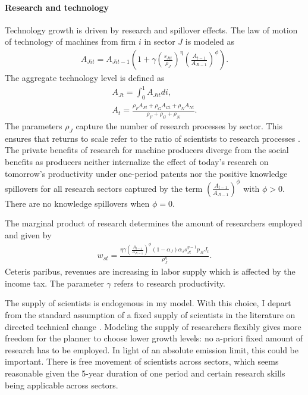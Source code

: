 \paragraph{Research and technology}
Technology growth is driven by research and spillover effects. 
The law of motion of technology of machines from firm $i$ in sector $J$ is modeled as
\begin{align*}
A_{Jit}=A_{Jit-1}\left(1+\gamma\left(\frac{s_{Jit}}{\rho_J}\right)^\eta\left(\frac{A_{t-1}}{A_{Jt-1}}\right)^\phi\right).
\end{align*}
The aggregate technology level is defined as
\begin{align*}
A_{Jt}=\int_{0}^{1}A_{Jit}di,\\
A_{t}=\frac{\rho_FA_{Ft}+\rho_GA_{Gt}+\rho_N A_{Nt}}{\rho_F+\rho_G+\rho_N}.
\end{align*}
The parameters $\rho_J$ capture the number of research processes by sector. This ensures that returns to scale refer to the ratio of scientists to research processes \citep{Fried2018ClimateAnalysis}. 
The private benefits of research for machine producers diverge from the social benefits as  producers neither internalize the effect of today's research on tomorrow's productivity under one-period patents nor the positive knowledge spillovers for all research sectors captured by the term $\left(\frac{A_{t-1}}{A_{Jt-1}}\right)^\phi$ with $\phi>0$. There are no knowledge spillovers when $\phi=0$.

The marginal product of research determines the amount of researchers employed and given by
\begin{align*}
w_{st}= \frac{\eta \gamma \left(\frac{A_{t-1}}{A_{Jt-1}}\right)^\phi (1-\alpha_J)\alpha_Js_{Jt}^{\eta-1}p_{Jt}J_t}{\rho_J^\eta}.
\end{align*}
Ceteris paribus, revenues are increasing in labor supply which is affected by the income tax. The parameter $\gamma$ refers to research productivity.

The supply of scientists is endogenous in my model. With this choice, I depart from the standard assumption of a fixed supply of scientists in the literature on directed technical change \citep{Acemoglu2012TheChange, Fried2018ClimateAnalysis}.  Modeling the supply of researchers flexibly gives more freedom for the planner to choose lower growth levels: no a-priori fixed amount of research has to be employed. In light of an absolute emission limit, this could be important.
There is free movement of scientists across sectors, which seems reasonable given the 5-year duration of one period and certain research skills being applicable across sectors. %


